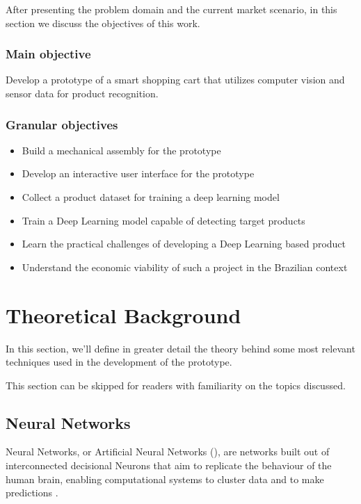 \documentclass[openright]{normas-utf-tex} %
\begin{document}
After presenting the problem domain and the current market scenario, in this section we discuss the 
objectives of this work.

\subsection{Main objective}
Develop a prototype of a smart shopping cart that utilizes computer
vision and sensor data for product recognition.

\subsection{Granular objectives}
\begin{itemize}
    \item Build a mechanical assembly for the prototype
    \item Develop an interactive user interface for the prototype
    \item Collect a product dataset for training a deep learning model
    \item Train a Deep Learning model capable of detecting target products
	\item Learn the practical challenges of developing a Deep Learning based product
    \item Understand the economic viability of such a project in the Brazilian context
\end{itemize}

\chapter{Theoretical Background}

In this section, we'll define in greater detail the theory behind some most
relevant techniques used in the development of the prototype.

This section can be skipped for readers with familiarity on the topics discussed.

\section{Neural Networks}

Neural Networks, or Artificial Neural Networks (),
are networks built out of interconnected decisional Neurons that aim to replicate 
the behaviour of the human brain, enabling computational systems to cluster data
and to make predictions \cite{IBMNeuralNetworks}. 
\end{document}
